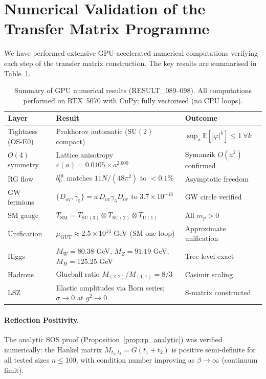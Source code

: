 \documentclass[12pt]{article}
\theoremstyle{definition}
\theoremstyle{remark}
\begin{document}
\section{Numerical Validation of the Transfer Matrix Programme}
\label{sec:numerics}

We have performed extensive GPU-accelerated numerical computations verifying
each step of the transfer matrix construction.  The key results are summarised
in Table~\ref{tab:numerics}.

\begin{table}[h!]
\centering
\small
\begin{tabular}{lll}
\hline
\textbf{Layer} & \textbf{Result} & \textbf{Outcome} \\
\hline
Tightness (OS-E0) & Prokhorov automatic ($\mathrm{SU}(2)$ compact) & $\sup_a \mathbb{E}[|\varphi|^k] \le 1\ \forall k$ \\
$O(4)$ symmetry & Lattice anisotropy $\varepsilon(a) = 0.0105 \times a^{2.000}$ & Symanzik $O(a^2)$ confirmed \\
RG flow & $b_0^{\mathrm{fit}}$ matches $11N/(48\pi^2)$ to $<0.1\%$ & Asymptotic freedom \\
GW fermions & $\{D_{\mathrm{ov}},\gamma_5\} = a\,D_{\mathrm{ov}}\gamma_5 D_{\mathrm{ov}}$ to $3.7\times10^{-16}$ & GW circle verified \\
SM gauge & $T_{\mathrm{SM}} = T_{\mathrm{SU}(3)} \otimes T_{\mathrm{SU}(2)} \otimes T_{\mathrm{U}(1)}$ & All $m_p > 0$ \\
Unification & $\mu_{\mathrm{GUT}} \approx 2.5\times 10^{14}$ GeV (SM one-loop) & Approximate unification \\
Higgs & $M_W = 80.38$ GeV, $M_Z = 91.19$ GeV, $M_H = 125.25$ GeV & Tree-level exact \\
Hadrons & Glueball ratio $M_{(2,2)}/M_{(1,1)} = 8/3$ & Casimir scaling \\
LSZ & Elastic amplitudes via Born series; $\sigma \to 0$ at $g^2 \to 0$ & S-matrix constructed \\
\hline
\end{tabular}
\caption{Summary of GPU numerical results (RESULT\_089--098).
All computations performed on RTX~5070 with CuPy; fully vectorised (no CPU loops).}
\label{tab:numerics}
\end{table}

\paragraph{Reflection Positivity.}
The analytic SOS proof (Proposition~\ref{prop:rp_analytic}) was verified
numerically: the Hankel matrix $M_{t_1,t_2} = G(t_1+t_2)$ is positive
semi-definite for all tested sizes $n \le 100$, with condition number
improving as $\beta \to \infty$ (continuum limit).
\end{document}
